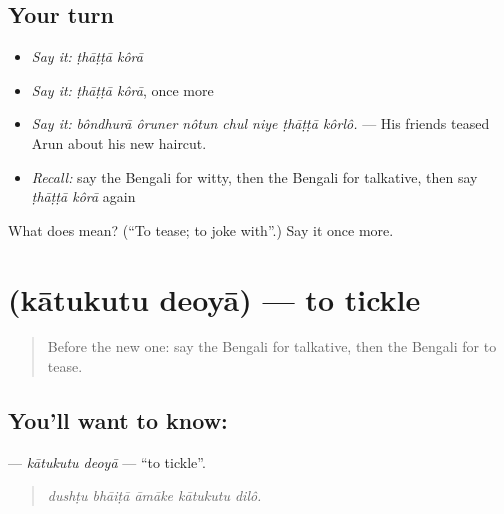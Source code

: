 \subsection*{Your turn}
\begin{itemize}
\raggedright
  \item \emph{Say it:} \emph{ṭhāṭṭā kôrā}
  \item \emph{Say it:} \emph{ṭhāṭṭā kôrā}, once more
  \item \emph{Say it:} \emph{bôndhurā ôruner nôtun chul niye ṭhāṭṭā kôrlô.} — His friends teased Arun about his new haircut.
  \item \emph{Recall:} say the Bengali for witty, then the Bengali for talkative, then say \emph{ṭhāṭṭā kôrā} again
\end{itemize}

\begin{tcolorbox}[breakable,colback=teal!4,colframe=teal!35!black,title={Before you move on}]
What does   mean? (\textquotedblleft{}To tease; to joke with\textquotedblright{}.) Say it once more.
\end{tcolorbox}
\section[\texorpdfstring{\bn{কাতুকুতু} \bn{দেওয়া} (kātukutu deoyā)}{কাতুকুতু দেওয়া (kātukutu deoyā)}]{  (kātukutu deoyā) — to tickle}

\label{lesson:BN-C463-katukutu-deoya}



\begin{quote}
Before the new one: say the Bengali for talkative, then the Bengali for to tease.
\end{quote}

\subsection*{You'll want to know:  }
\textbf{ } — \emph{kātukutu deoyā} — \textquotedblleft{}to tickle\textquotedblright{}.

\begin{quote}
    
\end{quote}

\begin{quote}
\emph{dushṭu bhāiṭā āmāke kātukutu dilô.}
\end{quote}

